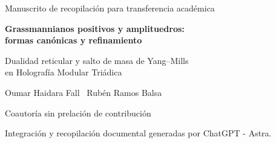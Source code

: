 \documentclass[a4paper,10pt]{article}
\theoremstyle{definition}\newtheorem{definition}[theorem]{Definición}
\theoremstyle{remark}\newtheorem{remark}[theorem]{Observación}
\numberwithin{equation}{section}
\begin{document}
\thispagestyle{plain}
\begin{center}
{\small Manuscrito de recopilación para transferencia académica}\par\vspace{6mm}
{\LARGE\bfseries Grassmannianos positivos y amplituedros:\\formas canónicas y refinamiento}\par\vspace{3mm}
{\large Dualidad reticular y salto de masa de Yang--Mills\\en Holografía Modular Triádica}\par\vspace{5mm}
Oumar Haidara Fall \textperiodcentered\ Rubén Ramos Balsa\par
{\fontsize{8}{10}\selectfont Coautoría sin prelación de contribución\par
Integración y recopilación documental generadas por ChatGPT - Astra.}
\end{center}
\end{document}
